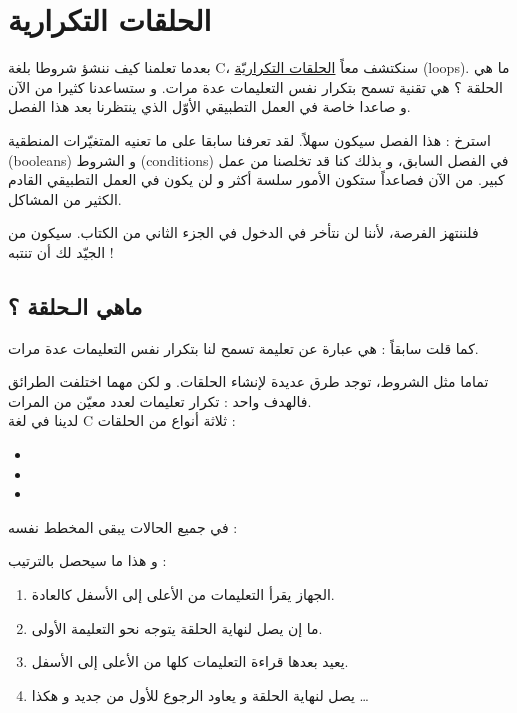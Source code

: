 \chapter{الحلقات التكرارية}

بعدما تعلمنا كيف ننشؤ شروطا بلغة 
\textenglish{C}،
سنكتشف معاً 
\underline{الحلقات التكراريّة} (\textenglish{loops}).
ما هي الحلقة ؟ هي تقنية تسمح بتكرار نفس التعليمات عدة مرات. و ستساعدنا كثيرا من الآن و صاعدا خاصة في العمل التطبيقي الأوّل الذي ينتظرنا بعد هذا الفصل.

استرخ : هذا الفصل سيكون سهلاً. لقد تعرفنا سابقا على ما تعنيه المتغيّرات المنطقية
(\textenglish{booleans})
و الشروط 
(\textenglish{conditions})
في الفصل السابق، و بذلك كنا قد تخلصنا من عمل كبير. من الآن فصاعداً ستكون الأمور سلسة أكثر و لن يكون في العمل التطبيقي القادم الكثير من المشاكل.

فلننتهز الفرصة، لأننا لن نتأخر في الدخول في الجزء الثاني من الكتاب. سيكون من الجيّد لك أن تنتبه !

\section{ماهي الـحلقة ؟}

كما قلت سابقاً : هي عبارة عن تعليمة تسمح لنا بتكرار نفس التعليمات عدة مرات. 

تماما مثل الشروط، توجد طرق عديدة لإنشاء الحلقات. و لكن مهما اختلفت الطرائق فالهدف واحد : تكرار تعليمات لعدد معيّن من المرات. \\
لدينا في لغة 
\textenglish{C}
ثلاثة أنواع من الحلقات :
\begin{itemize}
	\item {}
	\item {}
	\item {}
\end{itemize}
في جميع الحالات يبقى المخطط نفسه :

و هذا ما سيحصل بالترتيب :

\begin{enumerate}
	\item الجهاز يقرأ التعليمات من الأعلى إلى الأسفل كالعادة.
	\item ما إن يصل لنهاية الحلقة يتوجه نحو التعليمة الأولى.
	\item يعيد بعدها قراءة التعليمات كلها من الأعلى إلى الأسفل.
	\item يصل لنهاية الحلقة و يعاود الرجوع للأول من جديد و هكذا \dots
\end{enumerate}

